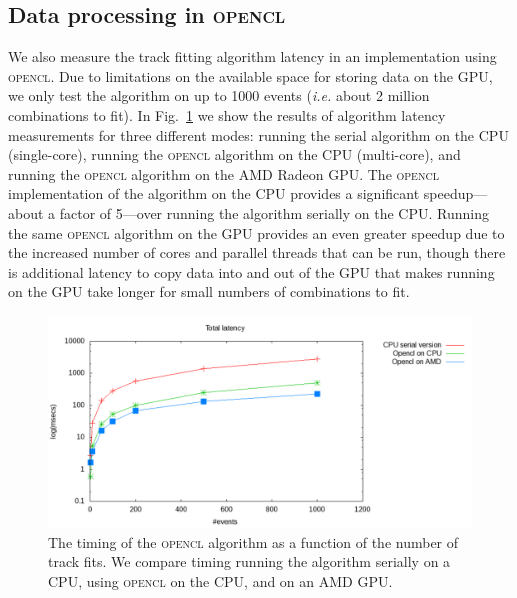 \documentclass[journal]{IEEEtran}
\begin{document}
\subsection{Data processing in \textsc{opencl}}
We also measure the track fitting algorithm latency in an implementation  
using \textsc{opencl}. Due to limitations on the available space for storing data on the GPU, we only test the 
algorithm on up to 1000 events (\textit{i.e.} about 2 million combinations to fit). In Fig.~\ref{fig:opencl_timing} 
we show the results of algorithm latency measurements for three different modes: running the serial algorithm  
on the CPU (single-core), running the \textsc{opencl} algorithm on the CPU (multi-core), and running the \textsc{opencl} algorithm
on the AMD Radeon GPU. The \textsc{opencl} implementation of the algorithm on the CPU provides a significant speedup---about 
a factor of 5---over running the algorithm serially on the CPU. Running the same \textsc{opencl} algorithm on the GPU provides an 
even greater speedup due to the increased number of cores and parallel threads that can be run, though there is additional latency to copy data 
into and out of the GPU that makes running on the GPU take longer for small numbers of combinations to fit.
\begin{figure}[!t]
  \centering
  \includegraphics[width=0.9\linewidth]{figures/TotalTimeOpencl_1000}
  \caption{The timing of the \textsc{opencl} algorithm as a function of the
    number of track fits. We compare timing running the algorithm serially on a CPU, 
    using \textsc{opencl} on the CPU, and on an AMD GPU.}
  \label{fig:opencl_timing}
\end{figure}
\end{document}
